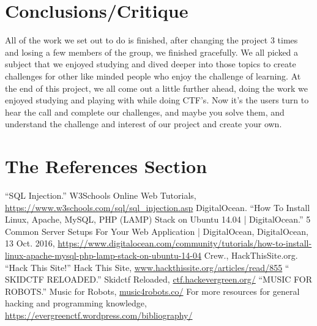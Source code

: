 \documentclass[runningheads,a4paper]{llncs}
\begin{document}
\section{Conclusions/Critique}

All of the work we set out to do is finished, after changing the project 3 times and losing a few members of the group, we finished gracefully. We all picked a subject that we enjoyed studying and dived deeper into those topics to create challenges for other like minded people who enjoy the challenge of learning. At the end of this project, we all come out a little further ahead, doing the work we enjoyed studying and playing with while doing CTF’s. Now it’s the users turn to hear the call and complete our challenges, and maybe you solve them, and understand the challenge and interest of our project and create your own.
\section{The References Section}\label{references}
\begin{thebibliography}{6}


“SQL Injection.” W3Schools Online Web Tutorials, \url{https://www.w3schools.com/sql/sql_injection.asp}
DigitalOcean. “How To Install Linux, Apache, MySQL, PHP (LAMP) Stack on Ubuntu 14.04 | DigitalOcean.” 5 Common Server Setups For Your Web Application | DigitalOcean, DigitalOcean, 13 Oct. 2016, \url{https://www.digitalocean.com/community/tutorials/how-to-install-linux-apache-mysql-php-lamp-stack-on-ubuntu-14-04}
Crew., HackThisSite.org. “Hack This Site!” Hack This Site, \url{www.hackthissite.org/articles/read/855}
“  SKIDCTF RELOADED.” Skidctf Reloaded, \url{ctf.hackevergreen.org/}
“MUSIC FOR ROBOTS.” Music for Robots, \url{music4robots.co/}
For more resources for general hacking and programming knowledge, \url{https://evergreenctf.wordpress.com/bibliography/}
\end{thebibliography}
\end{document}
